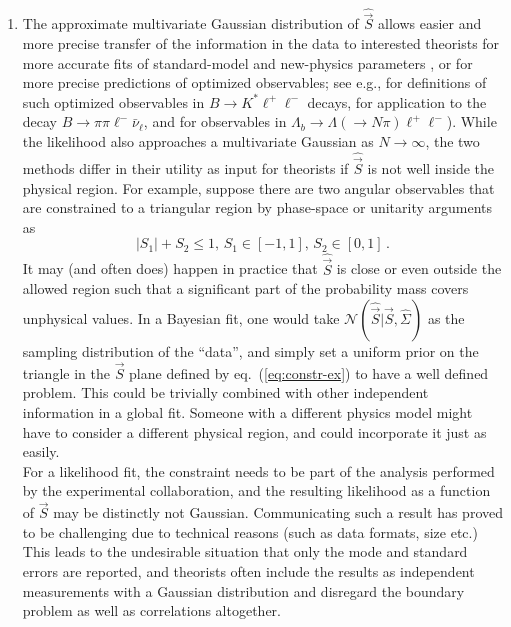 \documentclass[aps,nofootinbib,preprintnumbers,prd,twocolumn]{revtex4-1}
\newcommand{\refeq}[1]{eq.~(\ref{eq:#1})}
\newcommand{\vecest}[1]{\widehat{\vec{#1}}}
\begin{document}
\begin{enumerate}
\item The approximate multivariate Gaussian distribution of $\vecest{S}$
    allows easier and more precise transfer of the information in the
  data to interested theorists for more accurate fits of
  standard-model and new-physics parameters \cite{Altmannshofer:2013foa,
Descotes-Genon:2013wba,Beaujean:2013soa},
  or for more precise predictions of optimized observables; see e.g.,
  \cite{Egede:2008uy,Egede:2010zc,Bobeth:2010wg,Becirevic:2011bp,
    Bobeth:2012vn,Matias:2012xw,DescotesGenon:2012zf} for definitions
  of such optimized observables in $B\to K^*\ell^+\ell^-$ decays,
  \cite{Faller:2013dwa} for application to the decay $B\to
  \pi\pi\ell^-\bar\nu_\ell$, and \cite{Boer:2014kda} for observables
  in $\Lambda_b\to\Lambda(\to N\pi)\ell^+\ell^-$). While the
  likelihood also approaches a multivariate Gaussian as $N \to
  \infty$, the two methods differ in their utility as input for
  theorists if $\widehat{\vec{S}}$ is not well
  inside the physical region. For example, suppose there are two
  angular observables that are constrained to a triangular region by
  phase-space or unitarity arguments as
  \begin{equation}
    \label{eq:constr-ex}
    |S_1| + S_2 \le 1, \, S_1 \in [-1,1],\, S_2 \in [0,1] \,.
  \end{equation}
  It may (and often does) happen in practice that $\widehat{\vec{S}}$
  is close or even outside the allowed region such that a significant
  part of the probability mass covers unphysical values. In a Bayesian
  fit, one would take $\mathcal{N}(\vecest{S} | \vec{S},
  \widehat{\Sigma})$ as the sampling distribution of the ``data'', and
  simply set a uniform prior on the triangle in the $\vec{S}$ plane
  defined by \refeq{constr-ex} to have a well defined problem. This
  could be trivially combined with other independent information in a
  global fit. Someone with a different physics model might have to
  consider a
  different physical region, and could incorporate it just as easily.\\

  For a likelihood fit, the constraint needs to be part of the analysis
  performed by the experimental collaboration, and the resulting likelihood as
  a function of $\vec{S}$ may be distinctly not Gaussian.  Communicating such a
  result has proved to be challenging due to technical reasons (such as data
  formats, size etc.) This leads to the undesirable situation that only the
  mode and standard errors are reported, and theorists often include the
  results as independent measurements with a Gaussian distribution and
  disregard the boundary problem as well as correlations altogether.
\end{enumerate}
\end{document}
